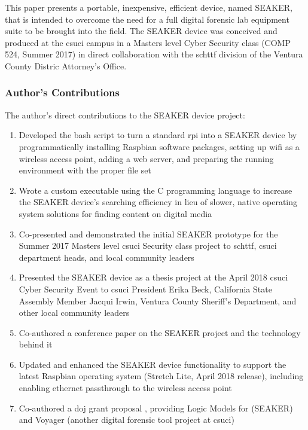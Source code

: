 \documentclass[12pt]{article}
\begin{document}
This paper presents a portable, inexpensive, efficient device, named SEAKER,
that is intended to overcome the need for a full digital
forensic lab equipment suite to be brought into the field.  The SEAKER device was conceived and 
produced at the \gls{csuci} campus in a 
Masters level Cyber Security class (COMP 524, Summer 2017) in direct collaboration with the
\gls{schttf} division of the Ventura County Distric Attorney's Office.\\


\subsubsection{Author's Contributions}
The author's direct contributions to the SEAKER device project:
\begin{enumerate}
  \item Developed the bash script to turn a standard \gls{rpi} into a
  SEAKER device by programmatically
  installing Raspbian software packages, setting up \gls{wifi} as a wireless access point, adding a web server,
  and preparing the running environment with the proper file set
  \item Wrote a custom executable using the C programming language to increase the SEAKER device's 
  searching efficiency in lieu of slower, native operating
  system solutions for finding content on digital media
  \item Co-presented and demonstrated the initial SEAKER prototype for the Summer 2017 Masters level \gls{csuci}
  Security class project to \gls{schttf}, \gls{csuci} department heads, and local community leaders
  \item Presented the SEAKER device as a thesis project at the April 2018 \gls{csuci} Cyber Security Event
  to \gls{csuci} President
  Erika Beck, California State Assembly Member Jacqui Irwin, Ventura County Sheriff's Department,
  and other local community leaders
  \item Co-authored a conference paper \cite{gentry2018seaker} on the SEAKER project and the technology behind it
  \item Updated and enhanced the SEAKER device functionality to support the latest Raspbian operating system (Stretch
  Lite, April 2018 release), including enabling ethernet passthrough to the wireless access point
  \item Co-authored a \gls{doj} grant proposal \cite{soltys2018dojgrant}, providing Logic Models
  for (SEAKER) and Voyager (another digital forensic tool project at \gls{csuci})
\end{enumerate}
\end{document}
